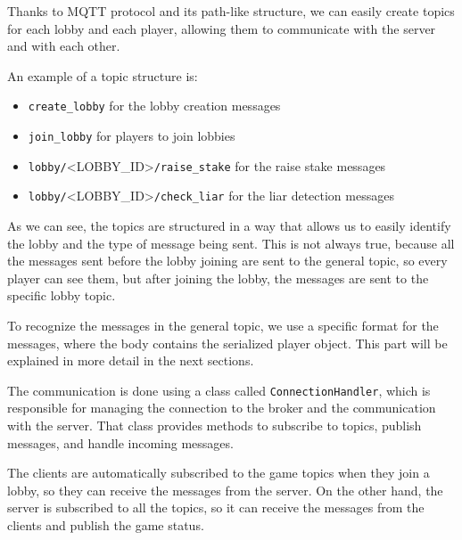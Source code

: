 \documentclass{scrartcl}
\begin{document}
Thanks to MQTT protocol and its path-like structure, we can easily create topics for each lobby 
and each player, allowing them to communicate with the server and with each other.

An example of a topic structure is:
\begin{itemize}
      \item \texttt{create\_lobby} for the lobby creation messages
      \item \texttt{join\_lobby} for players to join lobbies
      \item \texttt{lobby/}\textless LOBBY\_ID\textgreater\texttt{/raise\_stake} for the raise stake messages
      \item \texttt{lobby/}\textless LOBBY\_ID\textgreater\texttt{/check\_liar} for the liar detection messages
\end{itemize}

As we can see, the topics are structured in a way that allows us to easily identify the lobby and the 
type of message being sent. This is not always true, because all the messages sent before the lobby 
joining are sent to the general topic, so every player can see them, but after joining the lobby, the 
messages are sent to the specific lobby topic.

To recognize the messages in the general topic, we use a specific format for the messages, where the 
body contains the serialized player object. This part will be explained in more detail in the next 
sections.

The communication is done using a class called \texttt{ConnectionHandler}, which is responsible for 
managing the connection to the broker and the communication with the server. That class provides 
methods to subscribe to topics, publish messages, and handle incoming messages.

The clients are automatically subscribed to the game topics when they join a lobby, so they can 
receive the messages from the server. On the other hand, the server is subscribed to all the topics, 
so it can receive the messages from the clients and publish the game status.
\end{document}
